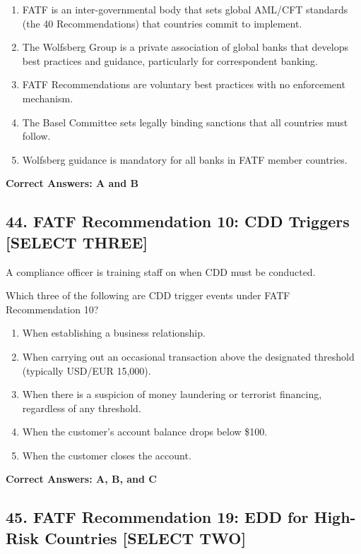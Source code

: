 \documentclass[11pt,a4paper]{article}
\begin{document}
	\begin{enumerate}[label=\Alph*.]
		\item FATF is an inter-governmental body that sets global AML/CFT standards (the 40 Recommendations) that countries commit to implement.
		\item The Wolfsberg Group is a private association of global banks that develops best practices and guidance, particularly for correspondent banking.
		\item FATF Recommendations are voluntary best practices with no enforcement mechanism.
		\item The Basel Committee sets legally binding sanctions that all countries must follow.
		\item Wolfsberg guidance is mandatory for all banks in FATF member countries.
	\end{enumerate}
	
	\textbf{Correct Answers: A and B}
	
	\subsection{44. FATF Recommendation 10: CDD Triggers \textnormal{[SELECT THREE]}}
	
	A compliance officer is training staff on when CDD must be conducted.
	
	Which three of the following are CDD trigger events under FATF Recommendation 10?
	
	\begin{enumerate}[label=\Alph*.]
		\item When establishing a business relationship.
		\item When carrying out an occasional transaction above the designated threshold (typically USD/EUR 15,000).
		\item When there is a suspicion of money laundering or terrorist financing, regardless of any threshold.
		\item When the customer's account balance drops below \$100.
		\item When the customer closes the account.
	\end{enumerate}
	
	\textbf{Correct Answers: A, B, and C}
	
	\subsection{45. FATF Recommendation 19: EDD for High-Risk Countries \textnormal{[SELECT TWO]}}
	
\end{document}
